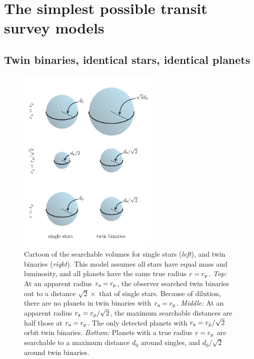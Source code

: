 \documentclass[12pt,modern]{aastex61}
\renewcommand{\a}{_{\rm a}}
\newcommand{\p}{_{\rm p}}
\begin{document}
%

\section{The simplest possible transit survey models}
\label{sec:simplest}

\subsection{Twin binaries, identical stars, identical planets}
\label{sec:model_1}

\begin{figure}[!tb]
    \begin{center}
        \includegraphics[width=0.6\textwidth]{figures/visualize_volumes.pdf}
    \end{center}
    \caption{
        Cartoon of the searchable volumes for single stars ({\it left}), and 
        twin binaries ({\it right}).
        This model assumes all stars have equal mass and luminosity, and 
        all planets have the same true radius $r=r\p$.
        {\it Top:} At an apparent radius $r\a=r\p$,
        the observer searched twin binaries out to a
        distance $\sqrt{2}\times$ that of single stars.
        Because of dilution, there are no planets in twin binaries with 
        $r\a=r\p$.
        {\it Middle:} At an apparent radius $r\a=r\p/\sqrt{2}$, the 
        maximum searchable distances are half those at $r\a=r\p$. 
        The only detected planets with $r\a=r\p/\sqrt{2}$ orbit twin binaries.
        {\it Bottom:} Planets with a true radius $r=r\p$ are searchable to 
        a maximum distance $d_0$ around singles, and $d_0/\sqrt{2}$ around 
        twin binaries.
    }
    \label{fig:model_1_volumes}
\end{figure}
\end{document}
